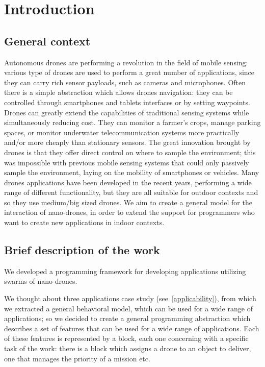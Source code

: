 \chapter{Introduction}
\label{cap1}


\section{General context}

Autonomous drones are performing a revolution in the field of mobile sensing:
various type of drones are used to perform a great number of applications, since they can carry rich sensor payloads, such as cameras and microphones.
Often there is a simple abstraction which allows drones navigation: they can be controlled through smartphones and tablets interfaces or by setting waypoints.
Drones can greatly extend the capabilities of traditional sensing systems while simultaneously reducing cost.
They can monitor a farmer’s crops, manage parking spaces, or monitor underwater telecommunication systems more practically and/or more cheaply than stationary sensors.
The great innovation brought by drones is that they offer direct control on where to sample the environment; this was impossible with previous mobile sensing systems that could only passively sample the environment, laying on the mobility of smartphones or vehicles.
Many drones applications have been developed in the recent years, performing a wide range of different functionality, but they are all suitable for outdoor contexts and so they use medium/big sized drones.
We aim to create a general model for the interaction of nano-drones, in order to extend the support for programmers who want to create new applications in indoor contexts.


\section{Brief description of the work}

We developed a programming framework for developing applications utilizing swarms of nano-drones.

We thought about three applications case study (see~\ref{applicability}), from which we extracted a general behavioral model, which can be used for a wide range of applications; so we decided to create a general programming abstraction which describes a set of features that can be used for a wide range of applications.
Each of these features is represented by a block, each one concerning with a specific task of the work: there is a block which assigns a drone to an object to deliver, one that manages the priority of a mission etc.

